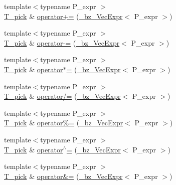 \begin{DoxyCompactItemize}
{\footnotesize template$<$typename P\+\_\+expr $>$ }\\\hyperlink{classVectorPick_ab257fd713ce0f2a81bc79059cec93ac9}{T\+\_\+pick} \& \hyperlink{classVectorPick_aaabc1ee6e23215b2f576247c0376ffd4}{operator+=} (\hyperlink{class__bz__VecExpr}{\+\_\+bz\+\_\+\+Vec\+Expr}$<$ P\+\_\+expr $>$)
\item 
{\footnotesize template$<$typename P\+\_\+expr $>$ }\\\hyperlink{classVectorPick_ab257fd713ce0f2a81bc79059cec93ac9}{T\+\_\+pick} \& \hyperlink{classVectorPick_a48ff411174b538c829dda9cba9d07972}{operator-\/=} (\hyperlink{class__bz__VecExpr}{\+\_\+bz\+\_\+\+Vec\+Expr}$<$ P\+\_\+expr $>$)
\item 
{\footnotesize template$<$typename P\+\_\+expr $>$ }\\\hyperlink{classVectorPick_ab257fd713ce0f2a81bc79059cec93ac9}{T\+\_\+pick} \& \hyperlink{classVectorPick_a3d0a4c9b237fc774e38ac3dd883fe932}{operator$\ast$=} (\hyperlink{class__bz__VecExpr}{\+\_\+bz\+\_\+\+Vec\+Expr}$<$ P\+\_\+expr $>$)
\item 
{\footnotesize template$<$typename P\+\_\+expr $>$ }\\\hyperlink{classVectorPick_ab257fd713ce0f2a81bc79059cec93ac9}{T\+\_\+pick} \& \hyperlink{classVectorPick_a47fed1814303f938936b8c6ec6181682}{operator/=} (\hyperlink{class__bz__VecExpr}{\+\_\+bz\+\_\+\+Vec\+Expr}$<$ P\+\_\+expr $>$)
\item 
{\footnotesize template$<$typename P\+\_\+expr $>$ }\\\hyperlink{classVectorPick_ab257fd713ce0f2a81bc79059cec93ac9}{T\+\_\+pick} \& \hyperlink{classVectorPick_a7f9a6cebcfa6032e6a507109c64f365a}{operator\%=} (\hyperlink{class__bz__VecExpr}{\+\_\+bz\+\_\+\+Vec\+Expr}$<$ P\+\_\+expr $>$)
\item 
{\footnotesize template$<$typename P\+\_\+expr $>$ }\\\hyperlink{classVectorPick_ab257fd713ce0f2a81bc79059cec93ac9}{T\+\_\+pick} \& \hyperlink{classVectorPick_a3b1c074dc66c4e679e572c397fdb56bc}{operator$^\wedge$=} (\hyperlink{class__bz__VecExpr}{\+\_\+bz\+\_\+\+Vec\+Expr}$<$ P\+\_\+expr $>$)
\item 
{\footnotesize template$<$typename P\+\_\+expr $>$ }\\\hyperlink{classVectorPick_ab257fd713ce0f2a81bc79059cec93ac9}{T\+\_\+pick} \& \hyperlink{classVectorPick_ad69dcb2b50002e974ddd90885072f428}{operator\&=} (\hyperlink{class__bz__VecExpr}{\+\_\+bz\+\_\+\+Vec\+Expr}$<$ P\+\_\+expr $>$)
\item 

\end{DoxyCompactItemize}
